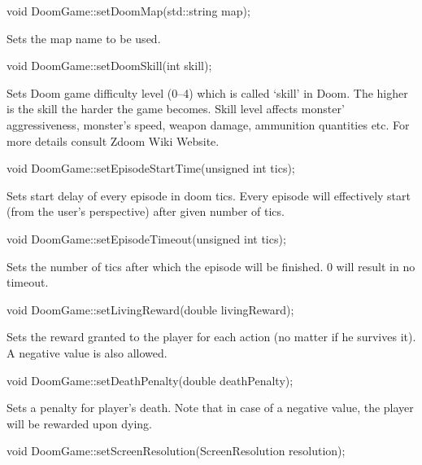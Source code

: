 \vspace{20pt}
\begin{clinee}
void DoomGame::setDoomMap(std::string map);
\end{clinee}
	Sets the map name to be used.


\vspace{20pt}
\begin{clinee}      
void DoomGame::setDoomSkill(int skill);
\end{clinee}
	Sets Doom game difficulty level (0--4) which is called `skill' in Doom. The higher is the skill the harder the game becomes. Skill level affects monster' aggressiveness, monster's speed, weapon damage, ammunition quantities etc. For more details consult Zdoom Wiki Website\cite{zdoom-wiki}.


\vspace{20pt}
\begin{clinee}    
void DoomGame::setEpisodeStartTime(unsigned int tics);
\end{clinee}

Sets start delay of every episode in doom tics. Every episode will effectively start (from the user's perspective) after given number of tics.


\vspace{20pt}
\begin{clinee}
void DoomGame::setEpisodeTimeout(unsigned int tics);
\end{clinee}

Sets the number of tics after which the episode will be finished. 0 will result in no timeout.


\vspace{20pt}
\begin{clinee}
void DoomGame::setLivingReward(double livingReward);
\end{clinee}

Sets the reward granted to the player for each action (no matter if he survives it). A negative value is also allowed.


\vspace{20pt}
\begin{clinee}
void DoomGame::setDeathPenalty(double deathPenalty);
\end{clinee}

	Sets a penalty for player's death. Note that in case of a negative value, the player will be rewarded upon dying.


\vspace{20pt}
\begin{clinee}
void DoomGame::setScreenResolution(ScreenResolution resolution);
\end{clinee}

